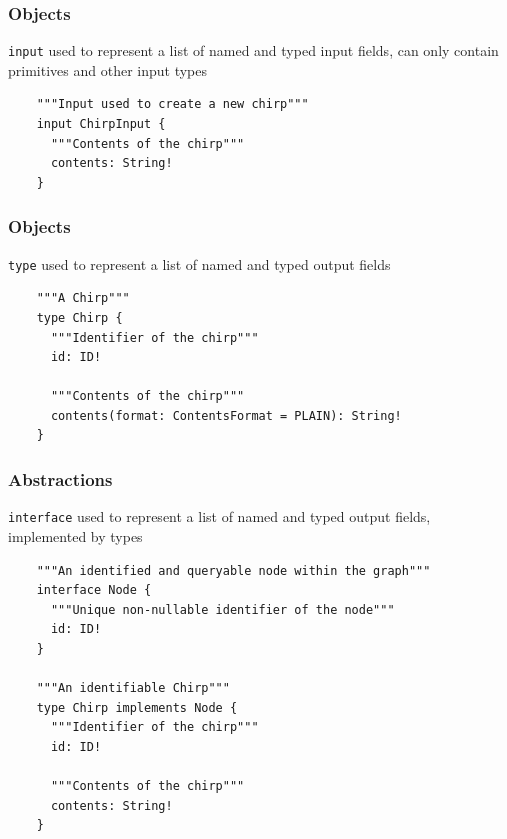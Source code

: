 \documentclass{beamer}
\begin{document}
\begin{frame}[fragile]
  \frametitle{Objects}
  \texttt{input} used to represent a list of named and typed input fields, can only contain primitives and other input types
  \begin{verbatim}
    """Input used to create a new chirp"""
    input ChirpInput {
      """Contents of the chirp"""
      contents: String!
    }
  \end{verbatim}
\end{frame}
\note{
}


\begin{frame}[fragile]
  \frametitle{Objects}
  \texttt{type} used to represent a list of named
  and typed output fields
  \begin{verbatim}
    """A Chirp"""
    type Chirp {
      """Identifier of the chirp"""
      id: ID!

      """Contents of the chirp"""
      contents(format: ContentsFormat = PLAIN): String!
    }
  \end{verbatim}
\end{frame}


\begin{frame}[fragile]
  \frametitle{Abstractions}
  \texttt{interface} used to represent a list of named and typed output fields, implemented by types
  \begin{verbatim}
    """An identified and queryable node within the graph"""
    interface Node {
      """Unique non-nullable identifier of the node"""
      id: ID!
    }

    """An identifiable Chirp"""
    type Chirp implements Node {
      """Identifier of the chirp"""
      id: ID!

      """Contents of the chirp"""
      contents: String!
    }
  \end{verbatim}
\end{frame}
\end{document}

